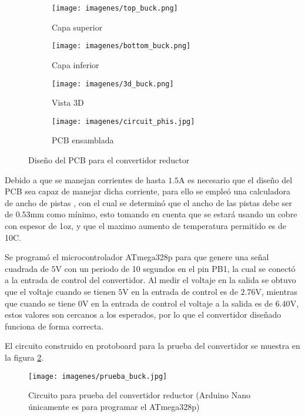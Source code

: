 \begin{figure}[H]
    \centering
    \begin{subfigure}{0.45\linewidth}
        \centering
        \texttt{[image: imagenes/top\_buck.png]}
        \caption{Capa superior}
    \end{subfigure}
    \begin{subfigure}{0.45\linewidth}
        \centering
        \texttt{[image: imagenes/bottom\_buck.png]}
        \caption{Capa inferior}
    \end{subfigure}
    \vfill
    \begin{subfigure}{0.45\linewidth}
        \centering
        \texttt{[image: imagenes/3d\_buck.png]}
        \caption{Vista 3D}
    \end{subfigure}
    \begin{subfigure}{0.45\linewidth}
        \centering
        \texttt{[image: imagenes/circuit\_phis.jpg]}
        \caption{PCB ensamblada}
    \end{subfigure}
    \caption{Diseño del PCB para el convertidor reductor}
    \label{fig:buck_pcb}
\end{figure}

Debido a que se manejan corrientes de hasta $1.5\text{A}$ es necesario que el
diseño del PCB sea capaz de manejar dicha corriente, para ello se empleó una 
calculadora de ancho de pistas \cite{noauthor_pcb_nodate}, con el cual se 
determinó que el ancho de las pistas debe ser de $0.53\text{mm}$ como mínimo,
esto tomando en cuenta que se estará usando un cobre con espesor de 1oz, y que
el maximo aumento de temperatura permitido es de 10\textordmasculine C. 

Se programó el microcontrolador ATmega328p para que genere una señal 
cuadrada de $5\text{V}$ con un periodo de 10 segundos en el pin PB1,
la cual se conectó a la entrada de control del convertidor. Al medir el voltaje
en la salida se obtuvo que el voltaje cuando se tienen $5\text{V}$ en la entrada
de control es de $2.76\text{V}$, mientras que cuando se tiene $0\text{V}$
en la entrada de control el voltaje a la salida es de $6.40\text{V}$, estos 
valores son cercanos a los esperados, por lo que el convertidor diseñado
funciona de forma correcta.

El circuito construido en protoboard para la prueba del convertidor se muestra
en la figura \ref{fig:prueba_buck}.

\begin{figure}[H]	
    \centering
    \texttt{[image: imagenes/prueba\_buck.jpg]}
    \caption{Circuito para prueba del convertidor reductor (Arduino Nano únicamente
    es para programar el ATmega328p)} 
    \label{fig:prueba_buck}
\end{figure}

